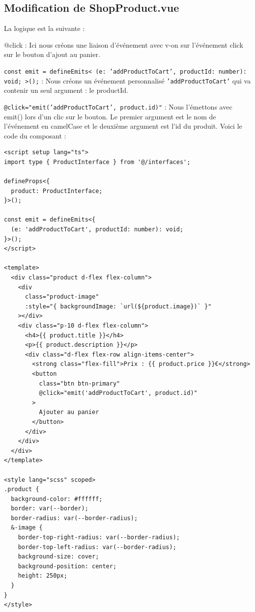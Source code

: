 \subsection{Modification de {\color{monOrange}ShopProduct.vue}}
La logique est la suivante :

{\color{monOrange}@click} : Ici nous créons une liaison d'événement avec {\color{monOrange}v-on} sur l'événement {\color{monOrange}click} sur le bouton d'ajout au panier.

{\tt const emit = defineEmits<{ (e: 'addProductToCart', productId: number): void; }>();} : Nous créons un événement personnalisé {\tt 'addProductToCart'} qui va contenir un seul argument : le {\color{monOrange}productId}.

{\tt @click="emit('addProductToCart', product.id)"} : Nous l'émettons avec {\color{monOrange}emit()} lors d'un clic sur le bouton. Le premier argument est le nom de l'événement en {\color{monOrange}camelCase} et le deuxième argument est l'{\color{monOrange}id} du produit. Voici le code du composant :
\begin{verbatim}
<script setup lang="ts">
import type { ProductInterface } from '@/interfaces';

defineProps<{
  product: ProductInterface;
}>();

const emit = defineEmits<{
  (e: 'addProductToCart', productId: number): void;
}>();
</script>

<template>
  <div class="product d-flex flex-column">
    <div
      class="product-image"
      :style="{ backgroundImage: `url(${product.image})` }"
    ></div>
    <div class="p-10 d-flex flex-column">
      <h4>{{ product.title }}</h4>
      <p>{{ product.description }}</p>
      <div class="d-flex flex-row align-items-center">
        <strong class="flex-fill">Prix : {{ product.price }}€</strong>
        <button
          class="btn btn-primary"
          @click="emit('addProductToCart', product.id)"
        >
          Ajouter au panier
        </button>
      </div>
    </div>
  </div>
</template>

<style lang="scss" scoped>
.product {
  background-color: #ffffff;
  border: var(--border);
  border-radius: var(--border-radius);
  &-image {
    border-top-right-radius: var(--border-radius);
    border-top-left-radius: var(--border-radius);
    background-size: cover;
    background-position: center;
    height: 250px;
  }
}
</style>
\end{verbatim}
